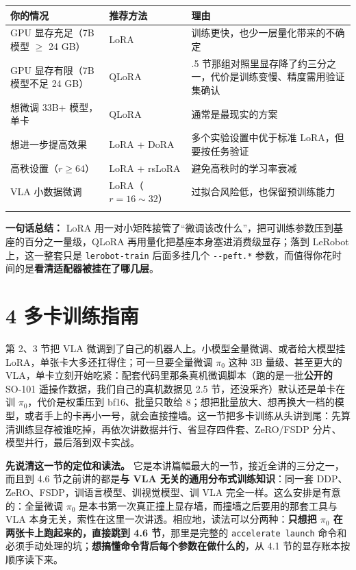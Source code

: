 \documentclass[
  chinese,
]{ctexart}
\begin{document}
\begin{center}
\begin{tabular}{@{}>{\raggedright\arraybackslash}p{} >{\raggedright\arraybackslash}p{} >{\raggedright\arraybackslash}p{}@{}}
\toprule\noalign{}
你的情况 & 推荐方法 & 理由 \\
\midrule\noalign{}
GPU 显存充足（7B 模型 \(\geq\) 24 GB） & LoRA & 训练更快，也少一层量化带来的不确定 \\
GPU 显存有限（7B 模型不足 24 GB） & QLoRA & 3.6.5 节那组对照里显存降了约三分之一，代价是训练变慢、精度需用验证集确认 \\
想微调 33B+ 模型，单卡 & QLoRA & 通常是最现实的方案 \\
想进一步提高效果 & LoRA + DoRA & 多个实验设置中优于标准 LoRA，但要按任务验证 \\
高秩设置（\(r \geq 64\)） & LoRA + rsLoRA & 避免高秩时的学习率衰减 \\
VLA 小数据微调 & LoRA（\(r=16\sim32\)） & 过拟合风险低，也保留预训练能力 \\
\bottomrule\noalign{}
\end{tabular}
\end{center}

\textbf{一句话总结：} LoRA
用一对小矩阵接管了``微调该改什么''，把可训练参数压到基座的百分之一量级，QLoRA
再用量化把基座本身塞进消费级显存；落到 LeRobot 上，这一整套只是
\texttt{lerobot-train} 后面多挂几个 \texttt{-\/-peft.*}
参数，而值得你花时间的是\textbf{看清适配器被挂在了哪几层}。

\section{4 多卡训练指南}\label{ux591aux5361ux8badux7ec3ux6307ux5357}

第 2、3 节把 VLA 微调到了自己的机器人上。小模型全量微调、或者给大模型挂
LoRA，单张卡大多还扛得住；可一旦要全量微调 \(\pi_0\) 这种 3B
量级、甚至更大的
VLA，单卡立刻开始吃紧：配套代码里那条真机微调脚本（跑的是一批\textbf{公开的}
SO-101 遥操作数据，我们自己的真机数据见 2.5
节，还没采齐）默认还是单卡在训 \(\pi_0\)，代价是权重压到
bf16、批量只敢给
8；想把批量放大、想再换大一档的模型，或者手上的卡再小一号，就会直接撞墙。这一节把多卡训练从头讲到尾：先算清训练显存被谁吃掉，再依次讲数据并行、省显存四件套、ZeRO/FSDP
分片、模型并行，最后落到双卡实战。

\textbf{先说清这一节的定位和读法。}
它是本讲篇幅最大的一节，接近全讲的三分之一，而且到 4.6
节之前讲的都是\textbf{与 VLA 无关的通用分布式训练知识}：同一套
DDP、ZeRO、FSDP，训语言模型、训视觉模型、训 VLA
完全一样。这么安排是有意的：全量微调 \(\pi_0\)
是本书第一次真正撞上显存墙，而撞墙之后要用的那套工具与 VLA
本身无关，索性在这里一次讲透。相应地，读法可以分两种：\textbf{只想把
\(\pi_0\) 在两张卡上跑起来的，直接跳到 4.6 节}，那里是完整的
\texttt{accelerate\ launch}
命令和必须手动处理的坑；\textbf{想搞懂命令背后每个参数在做什么的}，从
4.1 节的显存账本按顺序读下来。
\end{document}
